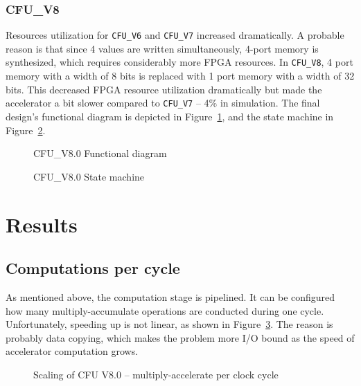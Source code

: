 \subsubsection{CFU\_V8}
Resources utilization for \verb|CFU_V6| and \verb|CFU_V7| increased dramatically. A probable reason is that since 4 values are written simultaneously, 4-port memory is synthesized, which requires considerably more FPGA resources. In \verb|CFU_V8|, 4 port memory with a width of 8 bits is replaced with 1 port memory with a width of 32 bits. This decreased FPGA resource utilization dramatically but made the accelerator a bit slower compared to \verb|CFU_V7| -- 4\% in simulation. The final design's functional diagram is depicted in Figure~\ref{fig:cfu_v8_functional_diagram}, and the state machine in Figure~\ref{fig:cfu_v8_state_machine}.

\begin{figure}[h!]
\centering
\caption{ CFU\_V8.0 Functional diagram }

\label{fig:cfu_v8_functional_diagram}
\end{figure}

\begin{figure}[h!]
\centering
\caption{ CFU\_V8.0 State machine }

\label{fig:cfu_v8_state_machine}
\end{figure}


\section{Results}


\subsection{Computations per cycle}
As mentioned above, the computation stage is pipelined. It can be configured how many multiply-accumulate operations are conducted during one cycle. Unfortunately, speeding up is not linear, as shown in Figure~\ref{fig:cfu_cycles_computation}. The reason is probably data copying, which makes the problem more I/O bound as the speed of accelerator computation grows. 

\begin{figure}[h!]
    \begin{center}
    \scalebox{1.0}{
        
    }
    \end{center}
    \caption{Scaling of CFU V8.0 -- multiply-accelerate per clock cycle}
    \label{fig:cfu_cycles_computation}
\end{figure}

